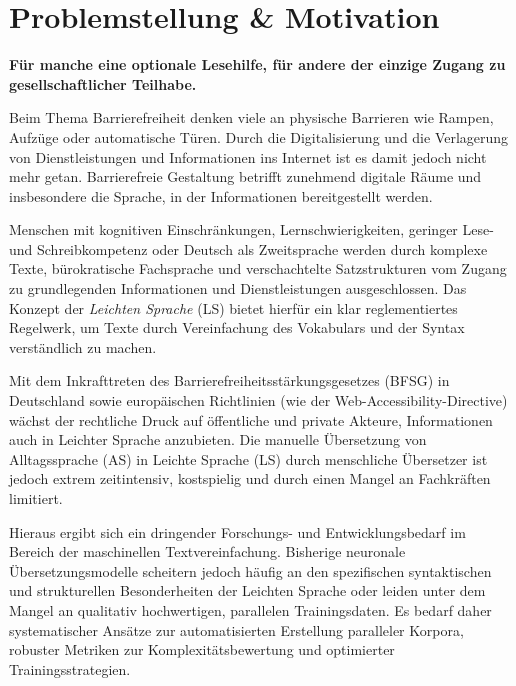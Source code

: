 \section{Problemstellung \& Motivation}
\label{sec:problemstellung_motivation}

\begin{tcolorbox}[boxrule=0pt,sharp corners,enhanced,borderline west={2pt}{0pt}{blue}]
    \textbf{Für manche eine optionale Lesehilfe, für andere der einzige Zugang zu gesellschaftlicher Teilhabe.}
\end{tcolorbox}

Beim Thema Barrierefreiheit denken viele an physische Barrieren wie Rampen, Aufzüge oder automatische Türen. Durch die Digitalisierung und die Verlagerung von Dienstleistungen und Informationen ins Internet ist es damit jedoch nicht mehr getan. Barrierefreie Gestaltung betrifft zunehmend digitale Räume und insbesondere die Sprache, in der Informationen bereitgestellt werden.

Menschen mit kognitiven Einschränkungen, Lernschwierigkeiten, geringer Lese- und Schreibkompetenz oder Deutsch als Zweitsprache werden durch komplexe Texte, bürokratische Fachsprache und verschachtelte Satzstrukturen vom Zugang zu grundlegenden Informationen und Dienstleistungen ausgeschlossen. Das Konzept der \textit{Leichten Sprache} (LS) bietet hierfür ein klar reglementiertes Regelwerk, um Texte durch Vereinfachung des Vokabulars und der Syntax verständlich zu machen. 

Mit dem Inkrafttreten des Barrierefreiheitsstärkungsgesetzes (BFSG) in Deutschland sowie europäischen Richtlinien (wie der Web-Accessibility-Directive) wächst der rechtliche Druck auf öffentliche und private Akteure, Informationen auch in Leichter Sprache anzubieten. Die manuelle Übersetzung von Alltagssprache (AS) in Leichte Sprache (LS) durch menschliche Übersetzer ist jedoch extrem zeitintensiv, kostspielig und durch einen Mangel an Fachkräften limitiert.

Hieraus ergibt sich ein dringender Forschungs- und Entwicklungsbedarf im Bereich der maschinellen Textvereinfachung. Bisherige neuronale Übersetzungsmodelle scheitern jedoch häufig an den spezifischen syntaktischen und strukturellen Besonderheiten der Leichten Sprache oder leiden unter dem Mangel an qualitativ hochwertigen, parallelen Trainingsdaten. Es bedarf daher systematischer Ansätze zur automatisierten Erstellung paralleler Korpora, robuster Metriken zur Komplexitätsbewertung und optimierter Trainingsstrategien.

